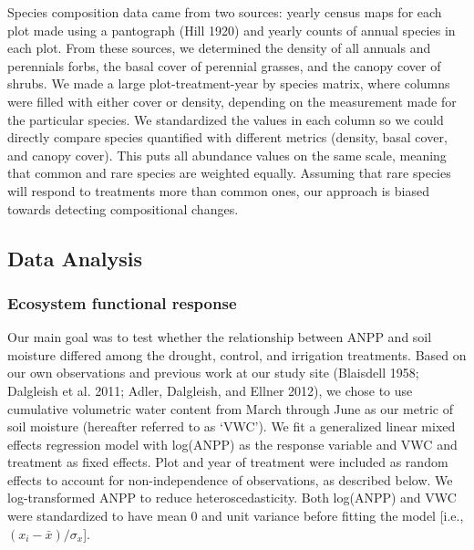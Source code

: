 \documentclass[fleqn,10pt,lineno]{wlpeerj} %
\begin{document}
Species composition data came from two sources: yearly census maps for
each plot made using a pantograph (Hill 1920) and yearly counts of
annual species in each plot. From these sources, we determined the
density of all annuals and perennials forbs, the basal cover of
perennial grasses, and the canopy cover of shrubs. We made a large
plot-treatment-year by species matrix, where columns were filled with
either cover or density, depending on the measurement made for the
particular species. We standardized the values in each column so we
could directly compare species quantified with different metrics
(density, basal cover, and canopy cover). This puts all abundance values
on the same scale, meaning that common and rare species are weighted
equally. Assuming that rare species will respond to treatments more than
common ones, our approach is biased towards detecting compositional
changes.

\hypertarget{data-analysis}{%
\subsection{Data Analysis}\label{data-analysis}}

\hypertarget{ecosystem-functional-response}{%
\subsubsection{Ecosystem functional
response}\label{ecosystem-functional-response}}

Our main goal was to test whether the relationship between ANPP and soil
moisture differed among the drought, control, and irrigation treatments.
Based on our own observations and previous work at our study site
(Blaisdell 1958; Dalgleish et al. 2011; Adler, Dalgleish, and Ellner
2012), we chose to use cumulative volumetric water content from March
through June as our metric of soil moisture (hereafter referred to as
`VWC'). We fit a generalized linear mixed effects regression model with
log(ANPP) as the response variable and VWC and treatment as fixed
effects. Plot and year of treatment were included as random effects to
account for non-independence of observations, as described below. We
log-transformed ANPP to reduce heteroscedasticity. Both log(ANPP) and
VWC were standardized to have mean 0 and unit variance before fitting
the model {[}i.e., \((x_i - \bar{x})/\sigma_x\){]}.
\end{document}
